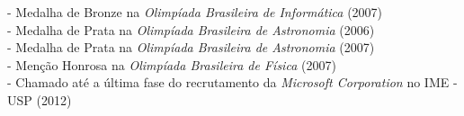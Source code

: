 \documentclass[]{res} %
\begin{document}
\begin{resume}
- Medalha de Bronze na {\sl Olimpíada Brasileira de Informática} (2007) \\
- Medalha de Prata na {\sl Olimpíada Brasileira de Astronomia} (2006) \\
- Medalha de Prata na {\sl Olimpíada Brasileira de Astronomia} (2007) \\
- Menção Honrosa na {\sl Olimpíada Brasileira de Física} (2007) \\
- Chamado até a última fase do recrutamento da {\sl Microsoft Corporation} no IME - USP (2012)


\end{resume}
\end{document}
